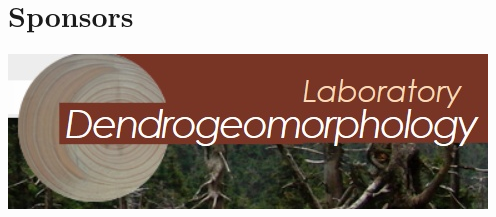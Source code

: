 \documentclass[
	openany, %
	parskip=false, %
	12pt, %
	a4paper, %
]{conferencebooklet} %
\begin{document}
% 
%
%
%
%
%
%
%
%
%

\newpage



\chapter{Sponsors}
\centering
\includegraphics[width=0.9\linewidth]{"images/logos/Partnerlogos/logo dendro"}
\end{document}
